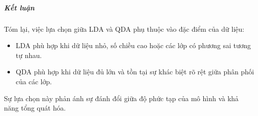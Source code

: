 \subparagraph{Kết luận}
Tóm lại, việc lựa chọn giữa LDA và QDA phụ thuộc vào đặc điểm của dữ liệu:
\begin{itemize}
  \item LDA phù hợp khi dữ liệu nhỏ, số chiều cao hoặc các lớp có phương sai
  tương tự nhau.
  \item QDA phù hợp khi dữ liệu đủ lớn và tồn tại sự khác biệt rõ rệt giữa
  phân phối của các lớp.
\end{itemize}

Sự lựa chọn này phản ánh sự đánh đổi giữa độ phức tạp của mô hình và khả năng
tổng quát hóa.
